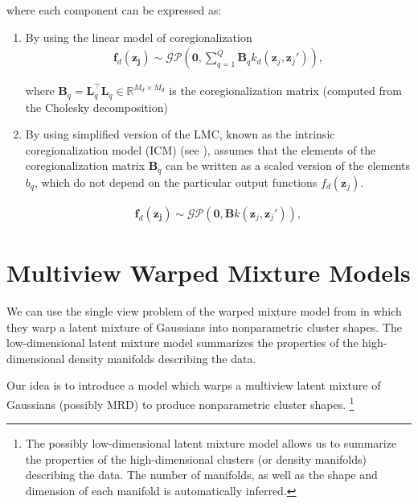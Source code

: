 \documentclass[]{article}
\newcommand{\lvecI}{\mathbf{z}_j}
\newcommand{\GP}[2]{\mathcal{GP}\left(#1,#2\right)}
\begin{document}
\begin{enumerate}
    where each component can be expressed as:
    
    \begin{enumerate}
    	\item By using the linear model of coregionalization  
    	\begin{align}
    	\mathbf{f}_d(\mathbf{\lvecI}) \sim \GP{\boldsymbol{0}}{\sum_{q=1}^{Q}\mathbf{B}_q k_d\left(\lvecI,\lvecI'\right)},
    	\end{align}
    	
    	where $\mathbf{B}_q = \mathbf{L}_q^\top\mathbf{L}_q \in \mathbb{R}^{M_d \times M_d}$ is the coregionalization matrix (computed from the Cholesky decomposition)
    	
    	\item By using simplified version of the LMC, known as the intrinsic coregionalization model (ICM) (see \cite{Alvarez12KVF}), assumes that the elements of the coregionalization matrix $\mathbf{B}_q$ can be written as a scaled version of the elements $b_q$, which do not depend on the particular output functions $f_d(\lvecI)$.
    	
    	\begin{align}
    	\mathbf{f}_d(\mathbf{\lvecI}) \sim \GP{\boldsymbol{0}}{\mathbf{B} k\left(\lvecI,\lvecI'\right)},
    	\end{align}
    	
    \end{enumerate}

\end{enumerate}



\section{Multiview Warped Mixture Models}

We can use the single view problem of the warped mixture model from \cite{IwaDuvGha2012warped} in which they warp a latent mixture of Gaussians into nonparametric cluster shapes. The low-dimensional latent mixture model summarizes the properties of the high-dimensional density manifolds describing the data.

Our idea is to introduce a model which warps a multiview latent mixture of Gaussians (possibly MRD) to produce nonparametric cluster shapes. \footnote{The possibly low-dimensional latent mixture model allows us to summarize the properties of the high-dimensional clusters
(or density manifolds) describing the data. The number of manifolds, as well as the shape and dimension of each manifold is automatically inferred.}
\end{document}
